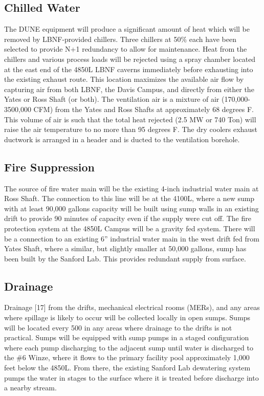 \subsection{Chilled Water}
\label{sec:fscf-und-ch-h2o}

The DUNE equipment will produce a significant amount of heat which will be removed by LBNF-provided chillers. Three chillers at 50\% each have been selected to provide N+1 redundancy to allow for maintenance. Heat from the chillers and various process loads will be rejected using a spray chamber located at the east end of the 4850L LBNF caverns immediately before exhausting into the existing exhaust route. This location maximizes the available air flow by capturing air from both LBNF, the Davis Campus, and directly from either the Yates or Ross Shaft (or both).  The ventilation air is a mixture of air (170,000-3500,000 CFM) from the Yates and Ross Shafts at approximately 68 degrees F. This volume of air is such that the total heat rejected (2.5 MW or 740 Ton) will raise the air temperature to no more than 95 degrees F. The dry coolers exhaust ductwork is arranged in a header and is ducted to the ventilation borehole.

\subsection{Fire Suppression}
\label{sec:fscf-und-fire-supp}

The source of fire water main will be the existing 4-inch industrial water main at Ross Shaft. The connection to this line will be at the 4100L, where a new sump with at least 90,000 gallons capacity will be built using sump walls in an existing drift to provide 90 minutes of capacity even if the supply were cut off. The fire protection system at the 4850L Campus will be a gravity fed system. There will be a connection to an existing 6” industrial water main in the west drift fed from Yates Shaft, where a similar, but slightly smaller at 50,000 gallons, sump has been built by the Sanford Lab. This provides redundant supply from surface.

\subsection{Drainage}
\label{sec:fscf-und-drain}

Drainage [17] from the drifts, mechanical electrical rooms (MERs), and any areas where spillage is likely to occur will be collected locally in open sumps. Sumps will be located every 500 in any areas where drainage to the drifts is not practical. Sumps will be equipped with sump pumps in a staged configuration where each pump discharging to the adjacent sump until water is discharged to the \#6 Winze, where it flows to the primary facility pool approximately 1,000 feet below the 4850L. From there, the existing Sanford Lab dewatering system pumps the water in stages to the surface where it is treated before discharge into a nearby stream.

